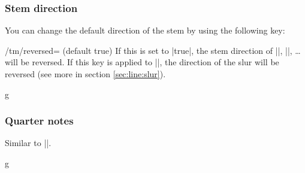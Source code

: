 \subsubsection{Stem direction}\label{sec:music-notes:commands:stem-direction}
You can change the default direction of the stem by using the following key:
\begin{key}{/tm/reversed= (default true)}
  If this is set to |true|, the stem direction of |\tmhalf|, |\tmquarter|, \dots 
  will be reversed. If this key is applied to |\tmslur|, the direction of the 
  slur will be reversed (see more in section \ref{sec:line:slur}).
\end{key}
\begin{codeexample}[]
\begin{tmline}
\begin{tmstaff}{g}{}
\end{tmstaff}
\end{tmline}
\end{codeexample}
\subsubsection{Quarter notes}\label{sec:music-notes:commands:quarter}
\begin{command}{\tmquarter{}}
  Similar to |\tmhalf|.
\end{command}
\begin{codeexample}[]
\begin{tmline}%
\begin{tmstaff}{g}{}
           
        
                 
          
\end{tmstaff}%
\end{tmline}
\end{codeexample}
